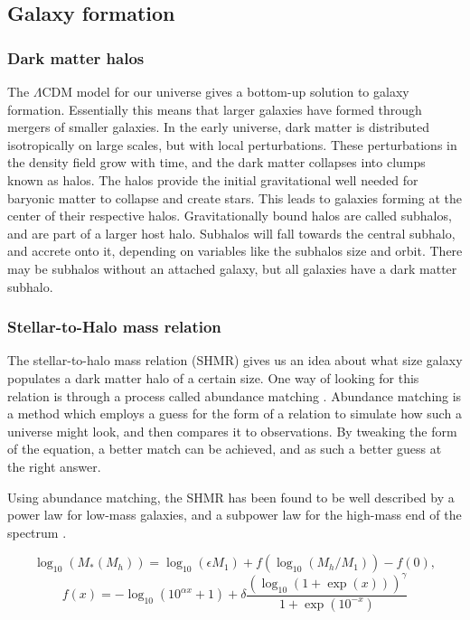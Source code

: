 \subsection{Galaxy formation}

\subsubsection{Dark matter halos}
The $\Lambda$CDM model for our universe gives a bottom-up solution to galaxy formation. Essentially this means that larger galaxies have formed through mergers of smaller galaxies. In the early universe, dark matter is distributed isotropically on large scales, but with local perturbations. These perturbations in the density field grow with time, and the dark matter collapses into clumps known as halos. The halos provide the initial gravitational well needed for baryonic matter to collapse and create stars. This leads to galaxies forming at the center of their respective halos. Gravitationally bound halos are called subhalos, and are part of a larger host halo. Subhalos will fall towards the central subhalo, and accrete onto it, depending on variables like the subhalos size and orbit. There may be subhalos without an attached galaxy, but all galaxies have a dark matter subhalo.

\subsubsection{Stellar-to-Halo mass relation}
The stellar-to-halo mass relation (SHMR) gives us an idea about what size galaxy populates a dark matter halo of a certain size. One way of looking for this relation is through a process called abundance matching \parencite{None2000}. Abundance matching is a method which employs a guess for the form of a relation to simulate how such a universe might look, and then compares it to observations. By tweaking the form of the equation, a better match can be achieved, and as such a better guess at the right answer. 

Using abundance matching, the SHMR has been found to be well described by a power law for low-mass galaxies, and a subpower law for the high-mass end of the spectrum \parencite{Behroozi2013}. 

\begin{equation}
    \log_{10}(M_*(M_h)) = \log_{10}(\epsilon M_1) + f(\log_{10}(M_h/M_1)) -f(0),
\end{equation}
\begin{equation*}
    f(x) = -\log_{10}(10^{\alpha x}+1)+\delta \frac{(\log_{10}(1+\exp(x)))^\gamma}{1 +\exp(10^{-x})}
\end{equation*}

